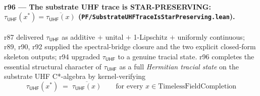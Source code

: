 \documentclass[11pt,a4paper]{amsart}
\theoremstyle{plain}
\theoremstyle{definition}
\begin{document}
\paragraph{r96 --- The substrate UHF trace is STAR-PRESERVING: $\tau_{\textsf{UHF}}(x^*) = \overline{\tau_{\textsf{UHF}}(x)}$ (\texttt{PF/SubstrateUHFTraceIsStarPreserving.lean}).} r87 delivered $\tau_{\textsf{UHF}}$ as additive $+$ unital $+$ 1-Lipschitz $+$ uniformly continuous; r89, r90, r92 supplied the spectral-bridge closure and the two explicit closed-form skeleton outputs; r94 upgraded $\tau_{\textsf{UHF}}$ to a genuine tracial state. r96 completes the essential structural character of $\tau_{\textsf{UHF}}$ as a full \emph{Hermitian tracial state} on the substrate UHF C*-algebra by kernel-verifying
\[
\boxed{\; \tau_{\textsf{UHF}}(x^*) \;=\; \overline{\tau_{\textsf{UHF}}(x)} \qquad \text{for every } x \in \mathrm{TimelessFieldCompletion} \;}
\]
\end{document}
